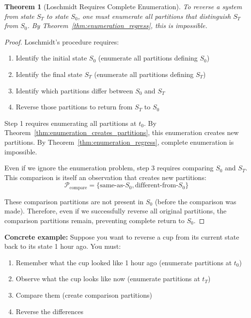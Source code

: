 \documentclass[twocolumn,10pt]{article}
\newtheorem{theorem}{Theorem}[section]
\theoremstyle{definition}
\theoremstyle{remark}
\begin{document}
\begin{theorem}[Loschmidt Requires Complete Enumeration]
\label{thm:loschmidt_requires_enumeration}
To reverse a system from state $S_T$ to state $S_0$, one must enumerate all partitions that distinguish $S_T$ from $S_0$. By Theorem~\ref{thm:enumeration_regress}, this is impossible.
\end{theorem}

\begin{proof}
Loschmidt's procedure requires:
\begin{enumerate}
\item Identify the initial state $S_0$ (enumerate all partitions defining $S_0$)
\item Identify the final state $S_T$ (enumerate all partitions defining $S_T$)
\item Identify which partitions differ between $S_0$ and $S_T$
\item Reverse those partitions to return from $S_T$ to $S_0$
\end{enumerate}

Step 1 requires enumerating all partitions at $t_0$. By Theorem~\ref{thm:enumeration_creates_partitions}, this enumeration creates new partitions. By Theorem~\ref{thm:enumeration_regress}, complete enumeration is impossible.

Even if we ignore the enumeration problem, step 3 requires comparing $S_0$ and $S_T$. This comparison is itself an observation that creates new partitions:
\begin{equation}
\mathcal{P}_{\text{compare}} = \{\text{same-as-}S_0, \text{different-from-}S_0\}
\end{equation}

These comparison partitions are not present in $S_0$ (before the comparison was made). Therefore, even if we successfully reverse all original partitions, the comparison partitions remain, preventing complete return to $S_0$.
\end{proof}

\noindent\textbf{Concrete example:} Suppose you want to reverse a cup from its current state back to its state 1 hour ago. You must:
\begin{enumerate}
\item Remember what the cup looked like 1 hour ago (enumerate partitions at $t_0$)
\item Observe what the cup looks like now (enumerate partitions at $t_T$)
\item Compare them (create comparison partitions)
\item Reverse the differences
\end{enumerate}
\end{document}
